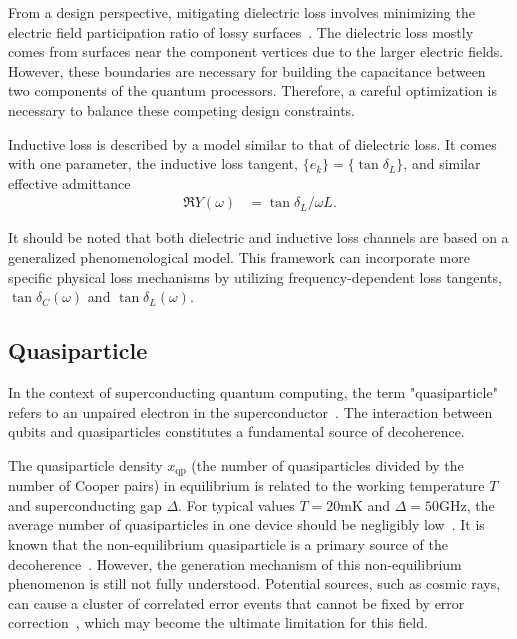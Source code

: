 \documentclass[a4paper,onecolumn,11pt,unpublished]{quantumarticle}
\newcommand{\setelem}[1]{\ensuremath{\{#1\}}}
\newcommand{\xqp}{x_{\text{qp}}}
\begin{document}
From a design perspective, mitigating dielectric loss involves minimizing the electric field participation ratio of lossy surfaces~\cite{Wang2015Surface,Gambetta2017Investigating,Woods2019Determining,Martinis2022Surface,Deng2023Titanium}. The dielectric loss mostly comes from surfaces near the component vertices due to the larger electric fields. However, these boundaries are necessary for building the capacitance between two components of the quantum processors. Therefore, a careful optimization is necessary to balance these competing design constraints.

Inductive loss is described by a model similar to that of dielectric loss. It comes with one parameter, the inductive loss tangent, $\setelem{e_k}=\setelem{\tan\delta_L}$, and similar effective admittance
\begin{align}
  \Re Y(\omega) & = \tan\delta_L / \omega L. \label{eq:t1_inductive}
\end{align}

It should be noted that both dielectric and inductive loss channels are based on a generalized phenomenological model. This framework can incorporate more specific physical loss mechanisms by utilizing frequency-dependent loss tangents, $\tan\delta_C(\omega)$ and $\tan\delta_L(\omega)$.

\subsection{Quasiparticle}
In the context of superconducting quantum computing, the term "quasiparticle" refers to an unpaired electron in the superconductor~\cite{Catelani2011Relaxation,Glazman2021Bogoliubov,Gustavsson2016Suppressing,Catelani2011Quasiparticle,Catelani2012Decoherence}. The interaction between qubits and quasiparticles constitutes a fundamental source of decoherence.

The quasiparticle density $\xqp$ (the number of quasiparticles divided by the number of Cooper pairs) in equilibrium is related to the working temperature $T$ and superconducting gap $\Delta$\cite{Catelani2012Decoherence}. For typical values $T=20\text{mK}$ and $\Delta=50\text{GHz}$, the average number of quasiparticles in one device should be negligibly low~\cite{Catelani2019Nonequilibrium}. It is known that the non-equilibrium quasiparticle is a primary source of the decoherence~\cite{Martinis2009Energy,Shaw2008Kinetics,Vool2014NonPoissonian,Wang2014Measurement}. However, the generation mechanism of this non-equilibrium phenomenon is still not fully understood. Potential sources, such as cosmic rays, can cause a cluster of correlated error events that cannot be fixed by error correction~\cite{McEwen2022Resolving}, which may become the ultimate limitation for this field.
\end{document}
